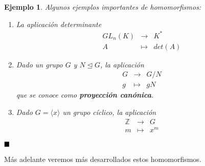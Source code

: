 \documentclass[12pt]{article}
\newtheorem{example}{Ejemplo}[theorem]
\begin{document}
\begin{example}\label{eq:ejsHoms} Algunos ejemplos importantes de homomorfismos:
\begin{enumerate}
\item La aplicación determinante $$\begin{array}{rccl}
&GL_n(K)&\longrightarrow &K^* \\
&A& \longmapsto &det(A)
\end{array}
$$
\item Dado un grupo $G$ y $N \unlhd G$, la aplicación $$\begin{array}{rccl}
&G&\longrightarrow &G/N \\
&g& \longmapsto &gN
\end{array}
$$ que se conoce como \textbf{proyección canónica}.
\item Dado $G = \langle x \rangle$ un grupo cíclico, la aplicación $$\begin{array}{rccl}
&\mathbb{Z}&\longrightarrow &G \\
&m& \longmapsto &x^m
\end{array}
$$
\end{enumerate}
\end{example}

$\hfill \blacksquare$

Más adelante veremos más desarrollados estos homomorfismos.
\end{document}

